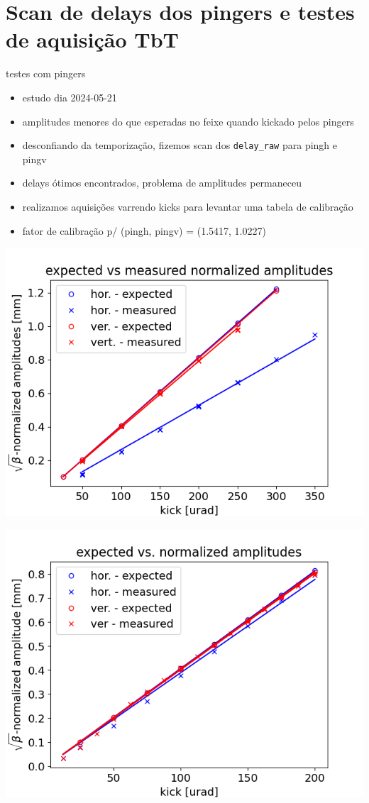 \documentclass[aspectratio=169]{beamer}            %
\begin{document}
\section{Scan de delays dos pingers e testes de aquisição TbT}
\begin{frame}{testes com pingers}

{\footnotesize
\begin{itemize}
    \item estudo dia 2024-05-21
    \item amplitudes menores do que esperadas no feixe quando kickado pelos pingers
    \item desconfiando da temporização, fizemos scan dos \texttt{delay\_raw} para pingh e pingv
    \item delays ótimos encontrados, problema de amplitudes permaneceu
    \item realizamos aquisições varrendo kicks para levantar uma tabela de calibração 
    \item fator de calibração p/ (pingh, pingv) = (1.5417, 1.0227)
\end{itemize} 
}
\begin{minipage}{0.49\textwidth}
    \centering
    \includegraphics[width=0.9\columnwidth]{2024-06-21/figures/norm_amp_expected_vs_observed-210524.png}
\end{minipage}
\hfill
\begin{minipage}{0.49\textwidth}
    \centering
    \includegraphics[width=0.9\columnwidth]{2024-06-21/figures/norm_amp_expected_vs_observed_post_calibration.png}

\end{minipage}
\end{frame}
\end{document}
